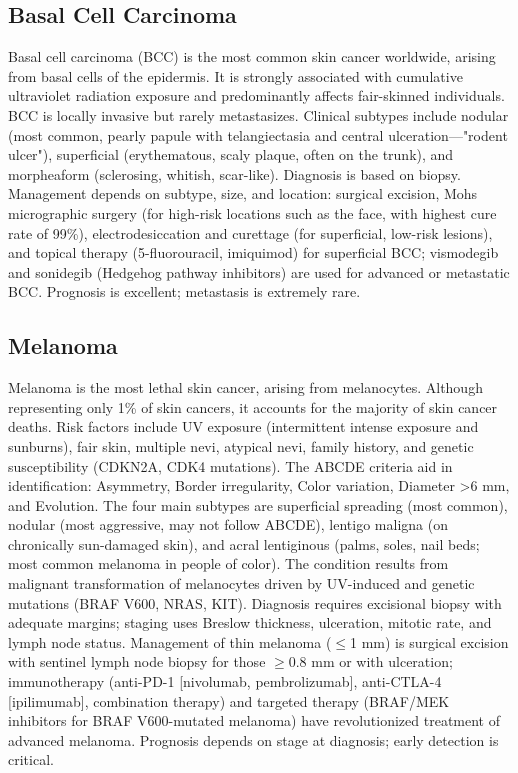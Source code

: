 \subsection{Basal Cell Carcinoma}
\label{sec:Basal Cell Carcinoma}
Basal cell carcinoma (BCC) is the most common skin cancer worldwide, arising from basal cells of the epidermis. It is strongly associated with cumulative ultraviolet radiation exposure and predominantly affects fair-skinned individuals. BCC is locally invasive but rarely metastasizes. Clinical subtypes include nodular (most common, pearly papule with telangiectasia and central ulceration---"rodent ulcer"), superficial (erythematous, scaly plaque, often on the trunk), and morpheaform (sclerosing, whitish, scar-like). Diagnosis is based on biopsy. Management depends on subtype, size, and location: surgical excision, Mohs micrographic surgery (for high-risk locations such as the face, with highest cure rate of 99\%), electrodesiccation and curettage (for superficial, low-risk lesions), and topical therapy (5-fluorouracil, imiquimod) for superficial BCC; vismodegib and sonidegib (Hedgehog pathway inhibitors) are used for advanced or metastatic BCC. Prognosis is excellent; metastasis is extremely rare.

\subsection{Melanoma}
\label{sec:Melanoma}
Melanoma is the most lethal skin cancer, arising from melanocytes. Although representing only 1\% of skin cancers, it accounts for the majority of skin cancer deaths. Risk factors include UV exposure (intermittent intense exposure and sunburns), fair skin, multiple nevi, atypical nevi, family history, and genetic susceptibility (CDKN2A, CDK4 mutations). The ABCDE criteria aid in identification: Asymmetry, Border irregularity, Color variation, Diameter >6 mm, and Evolution. The four main subtypes are superficial spreading (most common), nodular (most aggressive, may not follow ABCDE), lentigo maligna (on chronically sun-damaged skin), and acral lentiginous (palms, soles, nail beds; most common melanoma in people of color). The condition results from malignant transformation of melanocytes driven by UV-induced and genetic mutations (BRAF V600, NRAS, KIT). Diagnosis requires excisional biopsy with adequate margins; staging uses Breslow thickness, ulceration, mitotic rate, and lymph node status. Management of thin melanoma ($\leq$1 mm) is surgical excision with sentinel lymph node biopsy for those $\geq$0.8 mm or with ulceration; immunotherapy (anti-PD-1 [nivolumab, pembrolizumab], anti-CTLA-4 [ipilimumab], combination therapy) and targeted therapy (BRAF/MEK inhibitors for BRAF V600-mutated melanoma) have revolutionized treatment of advanced melanoma. Prognosis depends on stage at diagnosis; early detection is critical.

